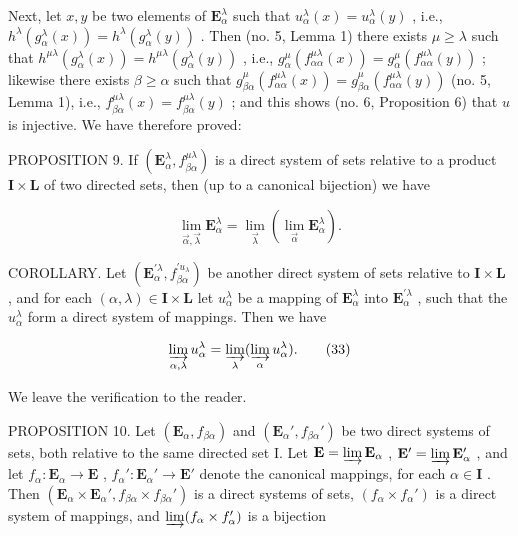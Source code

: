 Next, let \(x, y\) be two elements of \(\mathbf{E}_{\alpha}^{\lambda}\) such that \(u_{\alpha}^{\lambda}(x) = u_{\alpha}^{\lambda}(y)\) , i.e., \(h^{\lambda}(g_{\alpha}^{\lambda}(x)) = h^{\lambda}(g_{\alpha}^{\lambda}(y))\) . Then (no. 5, Lemma 1) there exists \(\mu \geqslant \lambda\) such that \(h^{\mu \lambda}(g_{\alpha}^{\lambda}(x)) = h^{\mu \lambda}(g_{\alpha}^{\lambda}(y))\) , i.e., \(g_{\alpha}^{\mu}(f_{\alpha \alpha}^{\mu \lambda}(x)) = g_{\alpha}^{\mu}(f_{\alpha \alpha}^{\mu \lambda}(y))\) ; likewise there exists \(\beta \geqslant \alpha\) such that \(g_{\beta \alpha}^{\mu}(f_{\alpha \alpha}^{\mu \lambda}(x)) = g_{\beta \alpha}^{\mu}(f_{\alpha \alpha}^{\mu \lambda}(y))\) (no. 5, Lemma 1), i.e., \(f_{\beta \alpha}^{\mu \lambda}(x) = f_{\beta \alpha}^{\mu \lambda}(y)\) ; and this shows (no. 6, Proposition 6) that \(u\) is injective. We have therefore proved:

PROPOSITION 9. If \((\mathbf{E}_{\alpha}^{\lambda}, f_{\beta \alpha}^{\mu \lambda})\) is a direct system of sets relative to a product \(\mathbf{I} \times \mathbf{L}\) of two directed sets, then (up to a canonical bijection) we have

\[
\lim _ {\overrightarrow {\alpha}, \overrightarrow {\lambda}} \mathbf {E} _ {\alpha} ^ {\lambda} = \lim _ {\overrightarrow {\lambda}} (\lim _ {\overrightarrow {\alpha}} \mathbf {E} _ {\alpha} ^ {\lambda}).\tag{32}
\]

COROLLARY. Let \((\mathbf{E}_{\alpha}^{\prime \lambda}, f_{\beta \alpha}^{\prime u_{\lambda}})\) be another direct system of sets relative to \(\mathbf{I} \times \mathbf{L}\) , and for each \((\alpha, \lambda) \in \mathbf{I} \times \mathbf{L}\) let \(u_{\alpha}^{\lambda}\) be a mapping of \(\mathbf{E}_{\alpha}^{\lambda}\) into \(\mathbf{E}_{\alpha}^{\prime \lambda}\) , such that the \(u_{\alpha}^{\lambda}\) form a direct system of mappings. Then we have

\[
\varinjlim_ {\alpha , \lambda} u _ {\alpha} ^ {\lambda} = \varinjlim_ {\lambda} (\varinjlim_ {\alpha} u _ {\alpha} ^ {\lambda}).\tag{33}
\]

We leave the verification to the reader.

PROPOSITION 10. Let \((\mathbf{E}_{\alpha}, f_{\beta \alpha})\) and \((\mathbf{E}_{\alpha}', f_{\beta \alpha}')\) be two direct systems of sets, both relative to the same directed set I. Let \(\mathbf{E} = \varinjlim \mathbf{E}_{\alpha}\) , \(\mathbf{E}' = \varinjlim \mathbf{E}_{\alpha}'\) , and let \(f_{\alpha}: \mathbf{E}_{\alpha} \to \mathbf{E}\) , \(f_{\alpha}': \mathbf{E}_{\alpha}' \to \mathbf{E}'\) denote the canonical mappings, for each \(\alpha \in \mathbf{I}\) . Then \((\mathbf{E}_{\alpha} \times \mathbf{E}_{\alpha}', f_{\beta \alpha} \times f_{\beta \alpha}')\) is a direct systems of sets, \((f_{\alpha} \times f_{\alpha}')\) is a direct system of mappings, and \(\varinjlim (f_{\alpha} \times f_{\alpha}')\) is a bijection

